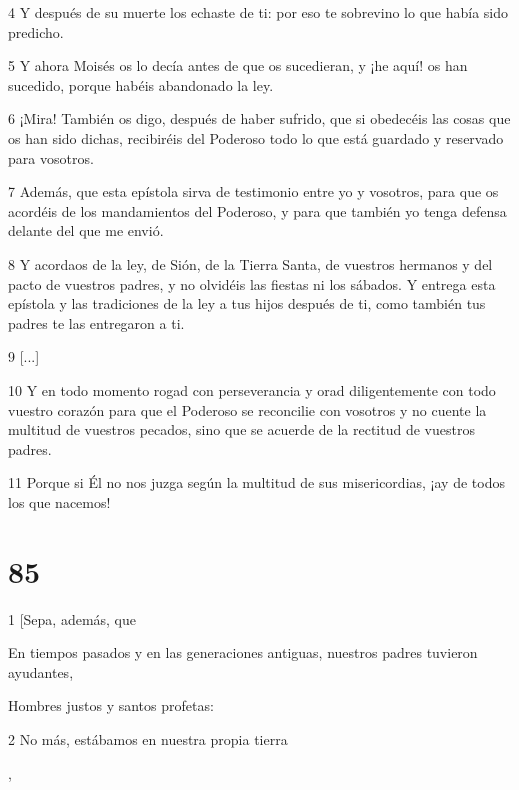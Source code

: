 \par 4 Y después de su muerte los echaste de ti: por eso te sobrevino lo que había sido predicho.

\par 5 Y ahora Moisés os lo decía antes de que os sucedieran, y ¡he aquí! os han sucedido, porque habéis abandonado la ley.

\par 6 ¡Mira! También os digo, después de haber sufrido, que si obedecéis las cosas que os han sido dichas, recibiréis del Poderoso todo lo que está guardado y reservado para vosotros.

\par 7 Además, que esta epístola sirva de testimonio entre yo y vosotros, para que os acordéis de los mandamientos del Poderoso, y para que también yo tenga defensa delante del que me envió.

\par 8 Y acordaos de la ley, de Sión, de la Tierra Santa, de vuestros hermanos y del pacto de vuestros padres, y no olvidéis las fiestas ni los sábados. Y entrega esta epístola y las tradiciones de la ley a tus hijos después de ti, como también tus padres te las entregaron a ti.

\par 9 [...]

\par 10 Y en todo momento rogad con perseverancia y orad diligentemente con todo vuestro corazón para que el Poderoso se reconcilie con vosotros y no cuente la multitud de vuestros pecados, sino que se acuerde de la rectitud de vuestros padres.

\par 11 Porque si Él no nos juzga según la multitud de sus misericordias, ¡ay de todos los que nacemos!

\chapter{85}

\par 1 [Sepa, además, que

\par En tiempos pasados ​​y en las generaciones antiguas, nuestros padres tuvieron ayudantes,

\par Hombres justos y santos profetas:

\par 2 No más, estábamos en nuestra propia tierra

\par [Y nos ayudaron cuando pecamos],

